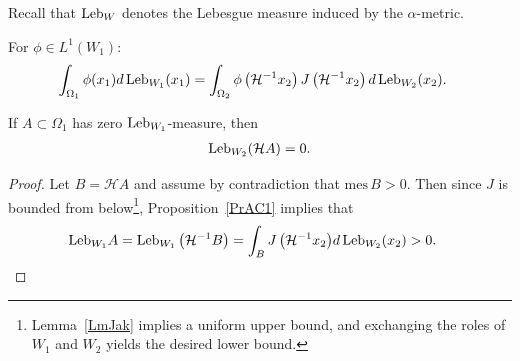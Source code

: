 \documentclass[10pt]{amsart}
\theoremstyle{definition}\newtheorem{defi}[theo]{Definition}\newtheorem{rema}[theo]{Remark}\newtheorem{exam}[theo]{Example}\newtheorem{exem}[theo]{Example}\newtheorem{nota}[theo]{Notation}
\newcommand{\mes}{{\mathrm{mes}}}
\newcommand{\hol}{\mathcal{H}}
\newcommand{\admName}{\alpha^{+}}
\newcommand{\Leb}{\textup{Leb}}
\renewcommand{\admName}{\alpha}
\begin{document}
Recall that $\Leb_{W}$ denotes the Lebesgue measure induced by the $\admName$-metric.
\begin{prop}\label{PrAC1}
For $\phi\in L^{1}(W_1)$:
\begin{align*}
\int_{\Omega_1} \phi(x_1) d\,\Leb_{W_{1}}(x_1) &=\int_{\Omega_2} \phi\left(\hol^{-1} x_{2}\right) J\left(\hol^{-1} x_{2}\right) d\,\Leb_{W_{2}}(x_{2}).
\end{align*}
\end{prop}
\begin{coro}\label{CrACMes}
If $A\subset \Omega_1$ has zero $\Leb_{W_{1}}$-measure, then
\begin{align*}
\Leb_{W_{2}}(\hol A)=0.
\end{align*}
\end{coro}
\begin{proof}
Let $B=\hol A$ and assume by contradiction that $\mes\,B > 0$. Then since $J$ is bounded from below\footnote{Lemma~\ref{LmJak} implies a uniform upper bound, and exchanging the roles of $W_{1}$ and $W_{2}$ yields the desired lower bound.}, Proposition~\ref{PrAC1} implies that
\begin{align*}
\Leb_{W_{1}}A = \Leb_{W_{1}}\left(\hol^{-1} B\right)=\int_B {J\left(\hol^{-1} x_2\right)}{d\,\Leb_{W_{2}}(x_2)}>0.& \qedhere
\end{align*}
\end{proof}
\end{document}
